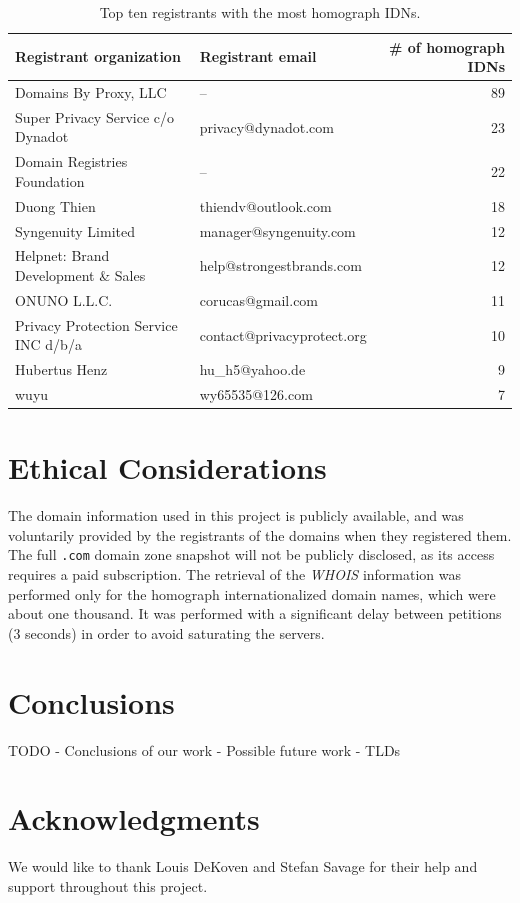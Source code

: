 \documentclass[letterpaper,twocolumn,10pt]{article}
\begin{document}
\begin{table}[ht!]
\centering
\begin{tabular}{llr}
\hline
Registrant organization              & Registrant email           & \# of homograph IDNs \\ \hline
Domains By Proxy, LLC                & --                         & 89                   \\
Super Privacy Service c/o Dynadot    & privacy@dynadot.com        & 23                   \\
Domain Registries Foundation         & --                         & 22                   \\
Duong Thien                          & thiendv@outlook.com        & 18                   \\
Syngenuity Limited                   & manager@syngenuity.com     & 12                   \\
Helpnet: Brand Development \& Sales  & help@strongestbrands.com   & 12                   \\
ONUNO L.L.C.                         & corucas@gmail.com          & 11                   \\
Privacy Protection Service INC d/b/a & contact@privacyprotect.org & 10                   \\
Hubertus Henz                        & hu\_h5@yahoo.de            & 9                    \\
wuyu                                 & wy65535@126.com            & 7                    \\ \hline
\end{tabular}
\caption{Top ten registrants with the most homograph IDNs.}
\label{top-registrants-homograph-idns}
\end{table}

\section{Ethical Considerations}
The domain information used in this project is publicly available, and was voluntarily provided by the registrants of the domains when they registered them.
The full \texttt{.com} domain zone snapshot will not be publicly disclosed, as its access requires a paid subscription.
The retrieval of the \textit{WHOIS} information was performed only for the homograph internationalized domain names, which were about one thousand.
It was performed with a significant delay between petitions (3 seconds) in order to avoid saturating the servers.

\section{Conclusions}
TODO
- Conclusions of our work
- Possible future work
- TLDs

\section*{Acknowledgments}
We would like to thank Louis DeKoven and Stefan Savage for their help and support throughout this project.

{\footnotesize 
}

\theendnotes
\end{document}
